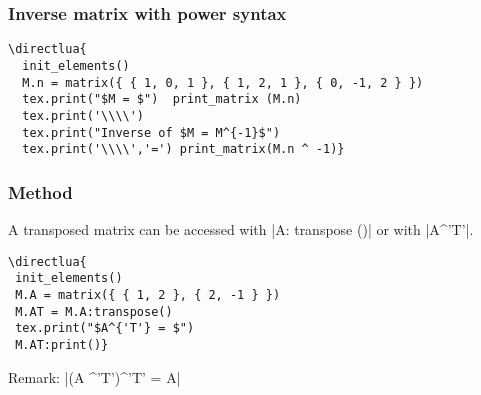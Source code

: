 \subsubsection{Inverse matrix with power syntax}
\label{ssub:inverse_matrix_with_power_syntax}

\begin{minipage}{.6\textwidth}
\begin{verbatim}
\directlua{
  init_elements()
  M.n = matrix({ { 1, 0, 1 }, { 1, 2, 1 }, { 0, -1, 2 } })
  tex.print("$M = $")  print_matrix (M.n)
  tex.print('\\\\')
  tex.print("Inverse of $M = M^{-1}$")
  tex.print('\\\\','=') print_matrix(M.n ^ -1)}
\end{verbatim}
\end{minipage}
\begin{minipage}{.4\textwidth}
\end{minipage}

\subsubsection{Method  }
\label{ssub:transpose_matrix}

A transposed matrix can be accessed with |A: transpose ()| or with |A^{'T'}|.

\vspace{.5em}
\begin{minipage}{.6\textwidth}
\begin{verbatim}
\directlua{
 init_elements()
 M.A = matrix({ { 1, 2 }, { 2, -1 } })
 M.AT = M.A:transpose()
 tex.print("$A^{'T'} = $")
 M.AT:print()}
\end{verbatim}
\end{minipage}
\begin{minipage}{.4\textwidth}
\end{minipage}

\vspace{.5em}
Remark: |(A ^'T')^'T' = A|

